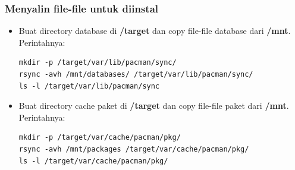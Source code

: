 \documentclass[12pt,]{article}
\begin{document}
	\subsubsection{Menyalin file-file untuk diinstal}
	\begin{itemize}
	\item Buat directory database di \textbf{/target} dan copy file-file database dari \textbf{/mnt}.
		Perintahnya:
		\begin{verbatim}
mkdir -p /target/var/lib/pacman/sync/
rsync -avh /mnt/databases/ /target/var/lib/pacman/sync/
ls -l /target/var/lib/pacman/sync
		\end{verbatim}
		
		\item Buat directory cache paket di \textbf{/target} dan copy file-file paket dari \textbf{/mnt}.
		Perintahnya:
		\begin{verbatim}
mkdir -p /target/var/cache/pacman/pkg/
rsync -avh /mnt/packages /target/var/cache/pacman/pkg/
ls -l /target/var/cache/pacman/pkg/
		\end{verbatim}
	\end{itemize}
\end{document}
